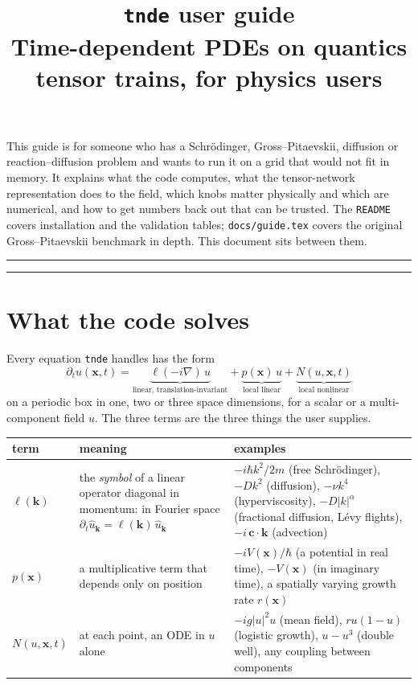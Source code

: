 \documentclass[11pt,a4paper]{article}
\title{\textbf{\texttt{tnde} user guide}\\[2pt]
  \large Time-dependent PDEs on quantics tensor trains, for physics users}
\date{}
\newcommand{\code}[1]{\texttt{#1}}
\newcommand{\vx}{\mathbf{x}}
\newcommand{\vk}{\mathbf{k}}
\begin{document}
\maketitle
\thispagestyle{empty}

\noindent
This guide is for someone who has a Schr\"odinger, Gross--Pitaevskii, diffusion or
reaction--diffusion problem and wants to run it on a grid that would not fit in memory.
It explains what the code computes, what the tensor-network representation does to the
field, which knobs matter physically and which are numerical, and how to get numbers
back out that can be trusted. The \code{README} covers installation and the validation
tables; \code{docs/guide.tex} covers the original Gross--Pitaevskii benchmark in
depth. This document sits between them.

\vspace{1em}
\hrule
\vspace{0.5em}
{\small\tableofcontents}
\vspace{0.5em}
\hrule
\newpage

\section{What the code solves}

Every equation \code{tnde} handles has the form
\begin{equation}
\partial_t u(\vx,t)
= \underbrace{\ell(-i\nabla)\,u}_{\text{linear, translation-invariant}}
+ \underbrace{p(\vx)\,u}_{\text{local linear}}
+ \underbrace{N(u,\vx,t)}_{\text{local nonlinear}}
\label{eq:master}
\end{equation}
on a periodic box in one, two or three space dimensions, for a scalar or a
multi-component field $u$. The three terms are the three things the user supplies.

\begin{tabularx}{\textwidth}{@{}lLL@{}}
\toprule
term & meaning & examples \\
\midrule
$\ell(\vk)$ & the \emph{symbol} of a linear operator diagonal in momentum: in Fourier
space $\partial_t \hat u_{\vk} = \ell(\vk)\,\hat u_{\vk}$ &
$-i\hbar k^2/2m$ (free Schr\"odinger), $-Dk^2$ (diffusion), $-\nu k^4$
(hyperviscosity), $-D|k|^{\alpha}$ (fractional diffusion, L\'evy flights),
$-i\,\mathbf c\cdot\vk$ (advection) \\
$p(\vx)$ & a multiplicative term that depends only on position &
$-iV(\vx)/\hbar$ (a potential in real time), $-V(\vx)$ (in imaginary time), a
spatially varying growth rate $r(\vx)$ \\
$N(u,\vx,t)$ & at each point, an ODE in $u$ alone &
$-ig|u|^2u$ (mean field), $ru(1-u)$ (logistic growth), $u-u^3$ (double well), any
coupling between components \\
\bottomrule
\end{tabularx}
\end{document}
